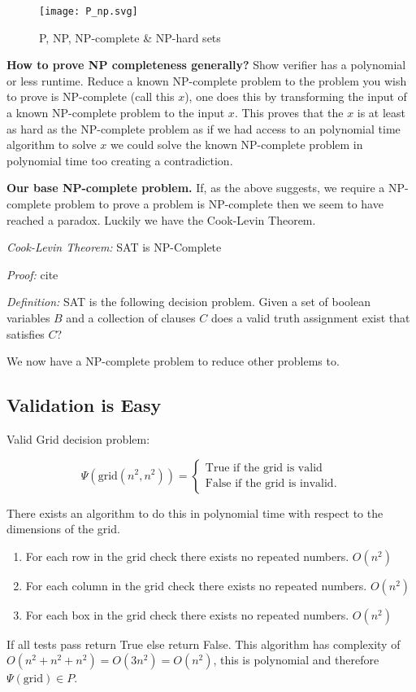 \documentclass[a4paper,12pt]{article}
\begin{document}
\begin{figure}[h!]
	\begin{center}
		\texttt{[image: P\_np.svg]}
	\end{center}
	\caption{P, NP, NP-complete \& NP-hard sets \cite{P_NP_Figure}}
\end{figure}

		\textbf{How to prove NP completeness generally?}
		Show verifier has a polynomial or less runtime.
		Reduce a known NP-complete problem to the problem you wish to prove is NP-complete (call this $x$), one does this by transforming the input of a known NP-complete problem to the input $x$. This proves that the $x$ is at least as hard as the NP-complete problem as if we had access to an polynomial time algorithm to solve $x$ we could solve the known NP-complete problem in polynomial time too creating a contradiction.

\textbf{Our base NP-complete problem.} If, as the above suggests, we require a NP-complete problem to prove a problem is NP-complete then we seem to have reached a paradox. Luckily we have the Cook-Levin Theorem.

\textit{Cook-Levin Theorem:} SAT is NP-Complete
	
\textit{Proof:} cite 

\textit{Definition: } SAT is the following decision problem. Given a set of boolean variables $B$ and a collection of clauses $C$ does a valid truth assignment exist that satisfies $C$?

We now have a NP-complete problem to reduce other problems to.

	\subsection{Validation is Easy}
Valid Grid decision problem:

		\begin{equation}
			\Psi(\text{grid}(n^2,n^2)) = \begin{cases}	
							     \text{True if the grid is valid} \\
							     \text{False if the grid is invalid}.
							     \end{cases}
		\end{equation}

There exists an algorithm to do this in polynomial time with respect to the dimensions of the grid. 
\begin{enumerate}
\item For each row in the grid check there exists no repeated numbers. $O(n^2)$
\item For each column in the grid check there exists no repeated numbers. $O(n^2)$
\item For each box in the grid check there exists no repeated numbers. $O(n^2)$
\end{enumerate}
If all tests pass return True else return False.
This algorithm has complexity of $O(n^2 + n^2 + n^2) = O(3n^2) = O(n^2)$, this is polynomial and therefore $\Psi(\text{grid}) \in P$.
\end{document}
